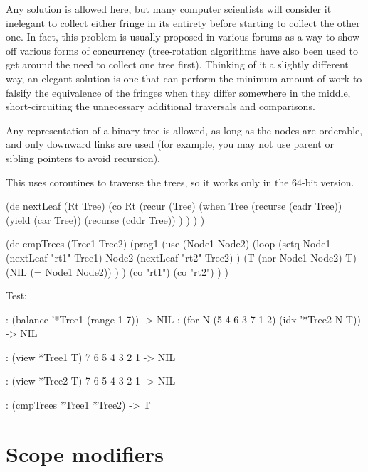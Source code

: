 Any solution is allowed here, but many computer scientists will consider
it inelegant to collect either fringe in its entirety before starting to
collect the other one. In fact, this problem is usually proposed in
various forums as a way to show off various forms of concurrency
(tree-rotation algorithms have also been used to get around the need to
collect one tree first). Thinking of it a slightly different way, an
elegant solution is one that can perform the minimum amount of work to
falsify the equivalence of the fringes when they differ somewhere in the
middle, short-circuiting the unnecessary additional traversals and
comparisons.

Any representation of a binary tree is allowed, as long as the nodes are
orderable, and only downward links are used (for example, you may not
use parent or sibling pointers to avoid recursion).

\begin{wideverbatim}


This uses coroutines to traverse the trees, so it works only in the
64-bit version.

(de nextLeaf (Rt Tree)
   (co Rt
      (recur (Tree)
         (when Tree
            (recurse (cadr Tree))
            (yield (car Tree))
            (recurse (cddr Tree)) ) ) ) )
 
(de cmpTrees (Tree1 Tree2)
   (prog1
      (use (Node1 Node2)
         (loop
            (setq
               Node1 (nextLeaf "rt1" Tree1)
               Node2 (nextLeaf "rt2" Tree2) )
            (T (nor Node1 Node2) T)
            (NIL (= Node1 Node2)) ) )
      (co "rt1")
      (co "rt2") ) )

\end{wideverbatim}

\begin{wideverbatim}

Test:

: (balance '*Tree1 (range 1 7))
-> NIL
: (for N (5 4 6 3 7 1 2) (idx '*Tree2 N T))
-> NIL
 
: (view *Tree1 T)
      7
   6
      5
4
      3
   2
      1
-> NIL
 
: (view *Tree2 T)
      7
   6
5
   4
      3
            2
         1
-> NIL
 
: (cmpTrees *Tree1 *Tree2)
-> T

\end{wideverbatim}

\pagebreak{}
\section*{Scope modifiers}

